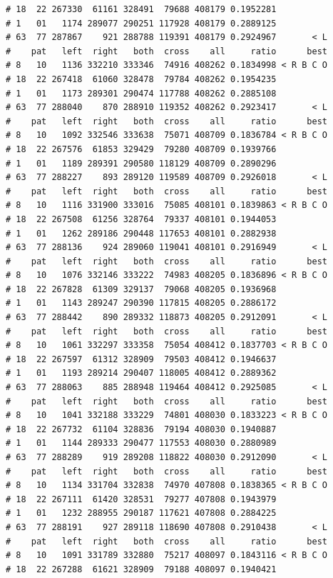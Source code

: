 \documentclass{article}\usepackage[]{graphicx}\usepackage[]{color}
\makeatletter
\newenvironment{kframe}{%
 \def\at@end@of@kframe{}%
 \ifinner\ifhmode%
  \def\at@end@of@kframe{\end{minipage}}%
  \begin{minipage}{\columnwidth}%
 \fi\fi%
 \def\FrameCommand##1{\hskip\@totalleftmargin \hskip-\fboxsep
 \colorbox{shadecolor}{##1}\hskip-\fboxsep
     \hskip-\linewidth \hskip-\@totalleftmargin \hskip\columnwidth}%
 \MakeFramed {\advance\hsize-\width
   \@totalleftmargin\z@ \linewidth\hsize
   \@setminipage}}%
 {\par\unskip\endMakeFramed%
 \at@end@of@kframe}
\newenvironment{knitrout}{}{} %
\makeatother
\begin{document}
\begin{knitrout}
\begin{kframe}
\begin{verbatim}
# 18  22 267330  61161 328491  79688 408179 0.1952281          
# 1   01   1174 289077 290251 117928 408179 0.2889125          
# 63  77 287867    921 288788 119391 408179 0.2924967       < L
#    pat   left  right   both  cross    all     ratio      best
# 8   10   1136 332210 333346  74916 408262 0.1834998 < R B C O
# 18  22 267418  61060 328478  79784 408262 0.1954235          
# 1   01   1173 289301 290474 117788 408262 0.2885108          
# 63  77 288040    870 288910 119352 408262 0.2923417       < L
#    pat   left  right   both  cross    all     ratio      best
# 8   10   1092 332546 333638  75071 408709 0.1836784 < R B C O
# 18  22 267576  61853 329429  79280 408709 0.1939766          
# 1   01   1189 289391 290580 118129 408709 0.2890296          
# 63  77 288227    893 289120 119589 408709 0.2926018       < L
#    pat   left  right   both  cross    all     ratio      best
# 8   10   1116 331900 333016  75085 408101 0.1839863 < R B C O
# 18  22 267508  61256 328764  79337 408101 0.1944053          
# 1   01   1262 289186 290448 117653 408101 0.2882938          
# 63  77 288136    924 289060 119041 408101 0.2916949       < L
#    pat   left  right   both  cross    all     ratio      best
# 8   10   1076 332146 333222  74983 408205 0.1836896 < R B C O
# 18  22 267828  61309 329137  79068 408205 0.1936968          
# 1   01   1143 289247 290390 117815 408205 0.2886172          
# 63  77 288442    890 289332 118873 408205 0.2912091       < L
#    pat   left  right   both  cross    all     ratio      best
# 8   10   1061 332297 333358  75054 408412 0.1837703 < R B C O
# 18  22 267597  61312 328909  79503 408412 0.1946637          
# 1   01   1193 289214 290407 118005 408412 0.2889362          
# 63  77 288063    885 288948 119464 408412 0.2925085       < L
#    pat   left  right   both  cross    all     ratio      best
# 8   10   1041 332188 333229  74801 408030 0.1833223 < R B C O
# 18  22 267732  61104 328836  79194 408030 0.1940887          
# 1   01   1144 289333 290477 117553 408030 0.2880989          
# 63  77 288289    919 289208 118822 408030 0.2912090       < L
#    pat   left  right   both  cross    all     ratio      best
# 8   10   1134 331704 332838  74970 407808 0.1838365 < R B C O
# 18  22 267111  61420 328531  79277 407808 0.1943979          
# 1   01   1232 288955 290187 117621 407808 0.2884225          
# 63  77 288191    927 289118 118690 407808 0.2910438       < L
#    pat   left  right   both  cross    all     ratio      best
# 8   10   1091 331789 332880  75217 408097 0.1843116 < R B C O
# 18  22 267288  61621 328909  79188 408097 0.1940421          

\end{verbatim}
\end{kframe}
\end{knitrout}
\end{document}
